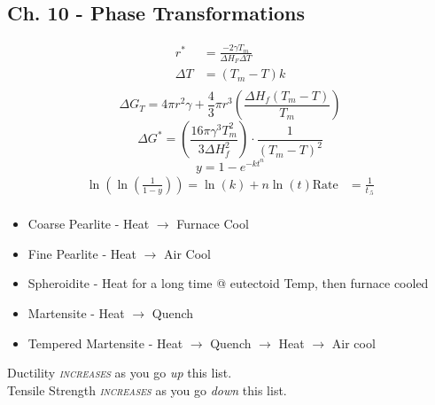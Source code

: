 	\subsection{Ch. 10 - Phase Transformations} \label{subsec:Ch10 Phase Transformations}
		\begin{equation}
			\begin{aligned}
				r^{*} &= \frac{-2 \gamma T_{m}}{\Delta H_{F} \Delta T} \\
				\Delta T &= \left( T_{m} - T \right) k \\
			\end{aligned}
		\end{equation}
		\begin{equation}
			\Delta G_{T} = 4 \pi r^{2} \gamma + \frac{4}{3} \pi r^{3} \left( \frac{\Delta H_{f} \left( T_{m} - T \right)}{T_{m}} \right)
		\end{equation}
		\begin{equation}
			\Delta G^{*} = \left( \frac{16 \pi \gamma^{3} T_{m}^{2}}{3 \Delta H_{f}^{2}} \right) \cdot \frac{1}{\left( T_{m} - T \right)^{2}}
		\end{equation}
		\begin{equation}
			y = 1-e^{-kt^{n}}
		\end{equation}
		\begin{equation}
			\begin{aligned}
				\ln \left( \ln \left( \frac{1}{1-y} \right) \right) = \ln \left( k \right) + n \ln \left( t \right)
				\text{Rate} &= \frac{1}{t_{.5}} \\
			\end{aligned}
		\end{equation}
		
		\begin{itemize}[noitemsep]
			\item Coarse Pearlite - Heat $\rightarrow$ Furnace Cool
			\item Fine Pearlite - Heat $\rightarrow$ Air Cool
			\item Spheroidite - Heat for a long time @ eutectoid Temp, then furnace cooled
			\item Martensite - Heat $\rightarrow$ Quench
			\item Tempered Martensite - Heat $\rightarrow$ Quench $\rightarrow$ Heat $\rightarrow$ Air cool
		\end{itemize}
		Ductility \emph{\textsc{increases}} as you go \emph{up} this list. \\
		Tensile Strength \emph{\textsc{increases}} as you go \emph{down} this list.